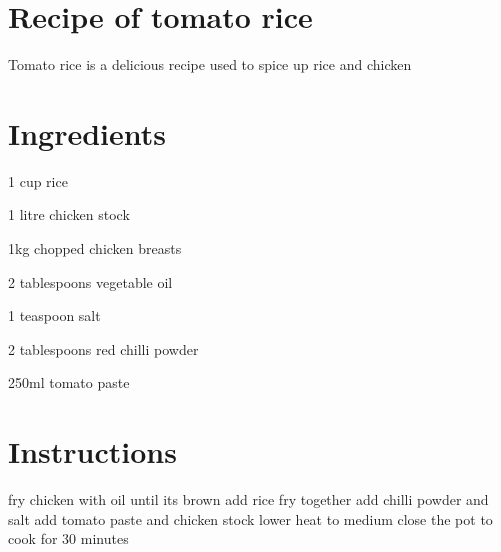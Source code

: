 \section { Recipe of tomato rice}
Tomato rice is a delicious recipe used to spice up rice and chicken
\section {Ingredients}
\begin {items}
\item 1 cup rice
\item 1 litre chicken stock
\item 1kg chopped chicken breasts
\item 2 tablespoons vegetable oil
\item 1 teaspoon salt
\item 2 tablespoons red chilli powder
\item 250ml tomato paste
\end {items}

\section {Instructions}
\begin {How to}
\cook fry chicken with oil until its brown
\cook add rice
\cook fry together
\cook add chilli powder and salt
\cook add tomato paste and chicken stock
\cook lower heat to medium
\cook close the pot to cook for 30 minutes

\end {How to}
